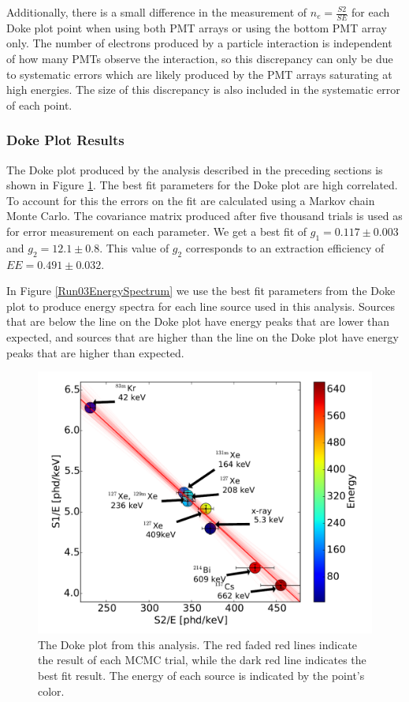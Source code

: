 \documentclass[a4paper,12pt]{article}
\begin{document}
{Additionally, there is a small difference in the measurement of $n_e=\frac{S2}{SE}$ for each Doke plot point when using both PMT arrays or using the bottom PMT array only. The number of electrons produced by a particle interaction is independent of how many PMTs observe the interaction, so this discrepancy can only be due to systematic errors which are likely produced by the PMT arrays saturating at high energies.  The size of this discrepancy is also included in the systematic error  of each point. 

\subsubsection{Doke Plot Results}


The Doke plot produced by the analysis described in the preceding sections is shown
in Figure \ref{DokePlot}.  The best fit parameters for the Doke plot are high correlated.  To account for this the errors on the fit are calculated using a Markov chain Monte Carlo.  The covariance matrix produced after five thousand trials is used as for error measurement on each parameter.  We get a best fit of $g_1= 0.117 \pm 0.003$ and $g_2=12.1 \pm 0.8$.  This value of $g_2$ corresponds to an extraction efficiency of $EE = 0.491 \pm 0.032$.

In Figure \ref{Run03EnergySpectrum} we use the best fit parameters from the Doke plot to produce energy spectra for each line source used in this analysis.  Sources that are below the line on the Doke plot have energy peaks that are lower than expected, and sources that are higher than the line on the Doke plot have energy peaks that are higher than expected.

\begin{figure}[H]
\centering
\includegraphics[scale=0.3]{DokePlot.png}
\caption{The Doke plot from this analysis.  The red faded red lines indicate the result of each MCMC trial, while the dark red line indicates the best fit result.  The energy of each source is indicated by the point's color.}
\label{DokePlot}
\end{figure}

}
\end{document}
